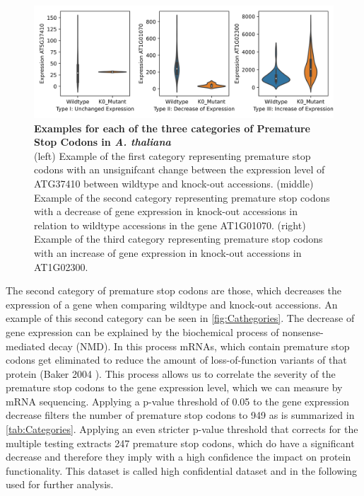 \begin{figure}[tb]
  \centering
  \begin{minipage}[h]{0.9\textwidth}
    \centering
    \includegraphics[width=1\textwidth]{images/Cathegories_Premature_Stop_Codons.png}
    \caption[Cathegories of Premature Stop Codons]{\textbf{Examples for each of the three categories of Premature Stop Codons in \textit{A. thaliana}}\\
    (left) Example of the first category representing premature stop codons with an unsignifcant change between the expression level of ATG37410 between wildtype and knock-out accessions. (middle) Example of the second category representing premature stop codons with a decrease of gene expression in knock-out accessions in relation to wildtype accessions in the gene AT1G01070.
    (right) Example of the third category representing premature stop codons with an increase of gene expression in knock-out accessions in AT1G02300.}
   \label{fig:Cathegories}
  \end{minipage}
\end{figure} 

The second category of premature stop codons are those, which decreases the expression of a gene when comparing wildtype and knock-out accessions. An example of this second category can be seen in \autoref{fig:Cathegories}. The decrease of gene expression can be explained by the biochemical process of nonsense-mediated decay (NMD). In this process mRNAs, which contain premature stop codons get eliminated to reduce the amount of loss-of-function variants of that protein (Baker 2004 \cite{Baker2004}). This process allows us to correlate the severity of the premature stop codons to the gene expression level, which we can measure by mRNA sequencing. Applying a p-value threshold of 0.05 to the gene expression decrease filters the number of premature stop codons to 949 as is summarized in \autoref{tab:Categories}. Applying an even stricter p-value threshold that corrects for the multiple testing extracts 247 premature stop codons, which do have a significant decrease and therefore they imply with a high confidence the impact on protein functionality. This dataset is called high confidential dataset and in the following used for further analysis. 

